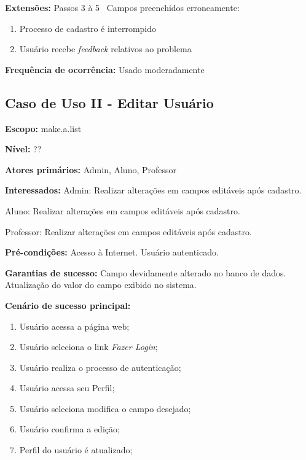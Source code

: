 \documentclass[12pt,oneside,a4paper,article]{abntex2}
\begin{document}
		\textbf{Extensões:} Passos 3 à 5 \textrightarrow \ Campos preenchidos erroneamente:
		
			\begin{enumerate}[label=\alph*.]	
				\item Processo de cadastro é interrompido
				\item Usuário recebe \textit{feedback} relativos ao problema	
			\end{enumerate}
		
		\textbf{Frequência de ocorrência:} Usado moderadamente
			
		\subsection{Caso de Uso II - Editar Usuário}
		
		\textbf{Escopo:} make.a.list 
		
		\textbf{Nível:} ??
		
		\textbf{Atores primários:} Admin, Aluno, Professor
		
		\textbf{Interessados:} Admin: Realizar alterações em campos editáveis após cadastro.
		
		Aluno: Realizar alterações em campos editáveis após cadastro.
		
		Professor: Realizar alterações em campos editáveis após cadastro.
		
		\textbf{Pré-condições:} Acesso à Internet. Usuário autenticado.
		
		\textbf{Garantias de sucesso:} Campo devidamente alterado no banco de dados. Atualização do valor do campo exibido no sistema. 
		
		\textbf{Cenário de sucesso principal:}
		
		\begin{enumerate}
			\item Usuário acessa a página web;
			
			\item Usuário seleciona o link \textit{Fazer Login};
			
			\item Usuário realiza o processo de autenticação;
			
			\item Usuário acessa seu Perfil;
			
			\item Usuário seleciona modifica o campo desejado;
			
			\item Usuário confirma a edição;
			
			\item Perfil do usuário é atualizado;
			
		\end{enumerate}
		
\end{document}
